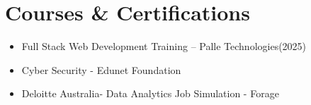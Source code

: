 \documentclass[a4paper,10pt]{article}
\begin{document}
\section{Courses \& Certifications}
\begin{itemize}[leftmargin=0.5cm]
    \item Full Stack Web Development Training – Palle Technologies(2025)
    \item Cyber Security - Edunet Foundation
    \item Deloitte Australia- Data Analytics Job Simulation - Forage
\end{itemize}
\end{document}
